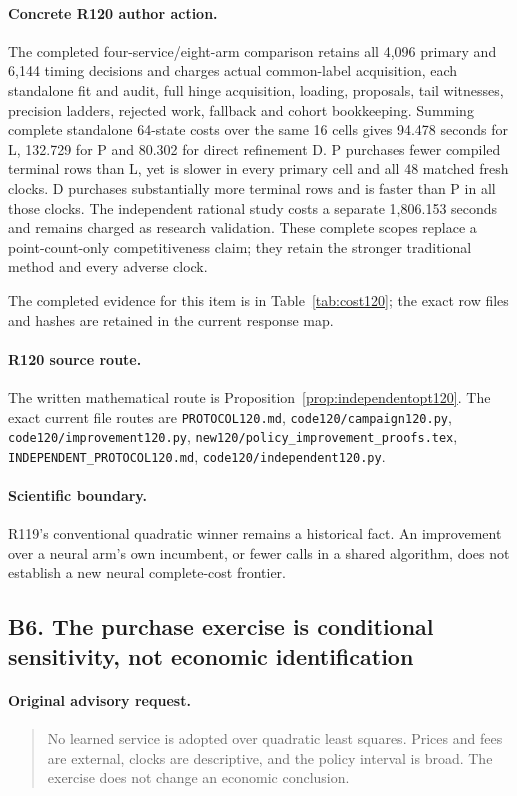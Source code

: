 \paragraph{Concrete R120 author action.}
The completed four-service/eight-arm comparison retains all 4,096 primary and 6,144 timing decisions and charges actual common-label acquisition, each standalone fit and audit, full hinge acquisition, loading, proposals, tail witnesses, precision ladders, rejected work, fallback and cohort bookkeeping. Summing complete standalone 64-state costs over the same 16 cells gives 94.478 seconds for L, 132.729 for P and 80.302 for direct refinement D. P purchases fewer compiled terminal rows than L, yet is slower in every primary cell and all 48 matched fresh clocks. D purchases substantially more terminal rows and is faster than P in all those clocks. The independent rational study costs a separate 1,806.153 seconds and remains charged as research validation. These complete scopes replace a point-count-only competitiveness claim; they retain the stronger traditional method and every adverse clock.

The completed evidence for this item is in Table~\ref{tab:cost120}; the exact row files and hashes are retained in the current response map.
\paragraph{R120 source route.}
The written mathematical route is Proposition~\ref{prop:independentopt120}. The exact current file routes are \nolinkurl{PROTOCOL120.md}, \nolinkurl{code120/campaign120.py}, \nolinkurl{code120/improvement120.py}, \nolinkurl{new120/policy_improvement_proofs.tex}, \nolinkurl{INDEPENDENT_PROTOCOL120.md}, \nolinkurl{code120/independent120.py}.
\paragraph{Scientific boundary.}
R119's conventional quadratic winner remains a historical fact. An improvement over a neural arm's own incumbent, or fewer calls in a shared algorithm, does not establish a new neural complete-cost frontier.

\subsection{B6. The purchase exercise is conditional sensitivity, not economic identification}
\label{response120:B6}
\paragraph{Original advisory request.}
\begin{quote}
No learned service is adopted over quadratic least squares. Prices and fees are external, clocks are descriptive, and the policy interval is broad. The exercise does not change an economic conclusion.
\end{quote}
